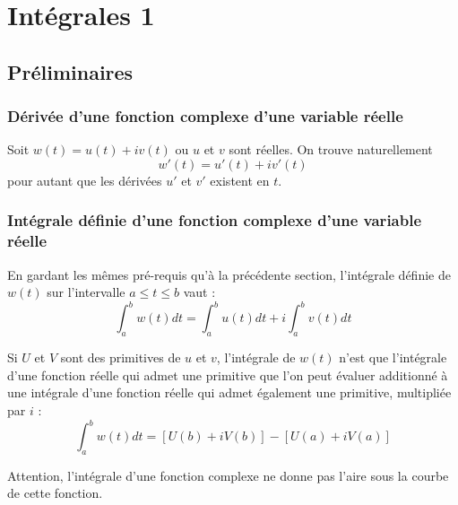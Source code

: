 \chapter{Intégrales 1}

\section{Préliminaires}

    \subsection{Dérivée d'une fonction complexe d'une variable réelle}
    Soit $w(t) = u(t) +iv(t)$ ou $u$ et $v$ sont réelles. On trouve naturellement 
    \begin{equation}
    w'(t) = u'(t) + iv'(t)
    \end{equation}
    pour autant que les dérivées $u'$ et $v'$ existent en $t$.\\
    
    
    \subsection{Intégrale définie d'une fonction complexe d'une variable réelle}
    En gardant les mêmes pré-requis qu'à la précédente section, l'intégrale définie de $w(t)$ sur
    l'intervalle $a \leq t \leq b$ vaut :
    \begin{equation}
    \int_a^b w(t) dt = \int_a^b u(t) dt + i\int_a^b v(t)dt
    \end{equation}
    
    Si $U$ et $V$ sont des primitives de $u$ et $v$, l'intégrale de $w(t)$ n'est que l'intégrale 
    d'une fonction réelle qui admet une primitive que l'on peut évaluer additionné à une intégrale
    d'une fonction réelle qui admet également une primitive, multipliée par $i$ :
    \begin{equation}
    \int_a^b w(t)dt = [U(b) + iV(b)] - [U(a) + iV(a)]
    \end{equation}
 
 Attention, l'intégrale d'une fonction complexe ne donne pas l'aire sous la courbe de cette fonction.   
    
